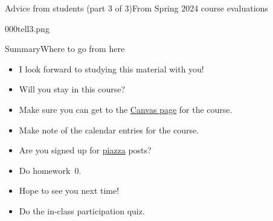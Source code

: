 \begin{frame}{Advice from students (part 3 of 3)}{From Spring 2024 course evaluations}

\Vskip{-3.6em}\begin{center}\begin{Pixture}[width=0.95\textwidth]{000}{tell3.png}  
\end{Pixture}\end{center}
    
\end{frame}

\begin{frame}{Summary}{Where to go from here}
\begin{itemize}
    \item I look forward to studying this material with you!
    \item Will you stay in this course? 
    \item Make sure you can get to the \href{\CourseWebPage}{Canvas page} for the course.
    \item Make note of the calendar entries for the course.
    \item Are you signed up for \href{https://piazza.com}{piazza} posts?
    \item Do homework~0.
    \item Hope to see you next time!
    \item Do the in-class participation quiz.
\end{itemize}
\end{frame}